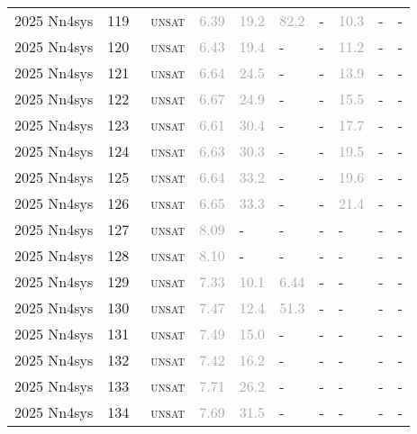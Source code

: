 \begin{center}
{\begin{longtable}{@{}llllllllll@{}}
2025 Nn4sys & 119 & ~\textsc{unsat} & \textcolor{darkgray}{6.39} & \textcolor{darkgray}{19.2} & \textcolor{darkgray}{82.2} & - & \textcolor{darkgray}{10.3} & - & - \\
2025 Nn4sys & 120 & ~\textsc{unsat} & \textcolor{darkgray}{6.43} & \textcolor{darkgray}{19.4} & - & - & \textcolor{darkgray}{11.2} & - & - \\
2025 Nn4sys & 121 & ~\textsc{unsat} & \textcolor{darkgray}{6.64} & \textcolor{darkgray}{24.5} & - & - & \textcolor{darkgray}{13.9} & - & - \\
2025 Nn4sys & 122 & ~\textsc{unsat} & \textcolor{darkgray}{6.67} & \textcolor{darkgray}{24.9} & - & - & \textcolor{darkgray}{15.5} & - & - \\
2025 Nn4sys & 123 & ~\textsc{unsat} & \textcolor{darkgray}{6.61} & \textcolor{darkgray}{30.4} & - & - & \textcolor{darkgray}{17.7} & - & - \\
2025 Nn4sys & 124 & ~\textsc{unsat} & \textcolor{darkgray}{6.63} & \textcolor{darkgray}{30.3} & - & - & \textcolor{darkgray}{19.5} & - & - \\
2025 Nn4sys & 125 & ~\textsc{unsat} & \textcolor{darkgray}{6.64} & \textcolor{darkgray}{33.2} & - & - & \textcolor{darkgray}{19.6} & - & - \\
2025 Nn4sys & 126 & ~\textsc{unsat} & \textcolor{darkgray}{6.65} & \textcolor{darkgray}{33.3} & - & - & \textcolor{darkgray}{21.4} & - & - \\
2025 Nn4sys & 127 & ~\textsc{unsat} & \textcolor{darkgray}{8.09} & - & - & - & - & - & - \\
2025 Nn4sys & 128 & ~\textsc{unsat} & \textcolor{darkgray}{8.10} & - & - & - & - & - & - \\
2025 Nn4sys & 129 & ~\textsc{unsat} & \textcolor{darkgray}{7.33} & \textcolor{darkgray}{10.1} & \textcolor{darkgray}{6.44} & - & - & - & - \\
2025 Nn4sys & 130 & ~\textsc{unsat} & \textcolor{darkgray}{7.47} & \textcolor{darkgray}{12.4} & \textcolor{darkgray}{51.3} & - & - & - & - \\
2025 Nn4sys & 131 & ~\textsc{unsat} & \textcolor{darkgray}{7.49} & \textcolor{darkgray}{15.0} & - & - & - & - & - \\
2025 Nn4sys & 132 & ~\textsc{unsat} & \textcolor{darkgray}{7.42} & \textcolor{darkgray}{16.2} & - & - & - & - & - \\
2025 Nn4sys & 133 & ~\textsc{unsat} & \textcolor{darkgray}{7.71} & \textcolor{darkgray}{26.2} & - & - & - & - & - \\
2025 Nn4sys & 134 & ~\textsc{unsat} & \textcolor{darkgray}{7.69} & \textcolor{darkgray}{31.5} & - & - & - & - & - \\

\end{longtable}}
\end{center}
